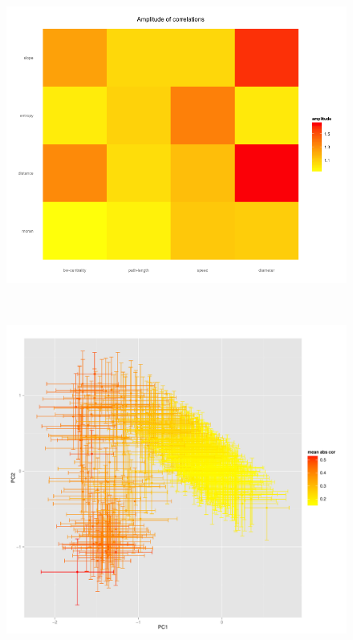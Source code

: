 \documentclass{article}
\begin{document}
\begin{figure}[h!]
\begin{minipage}{0.34\linewidth}
\includegraphics[width=\textwidth]{heatmap_amplCor}
\end{minipage}\\
\begin{minipage}{0.45\linewidth}
\includegraphics[width=\textwidth]{pca_meanAbsCor_errorBars}
\end{minipage}
\begin{minipage}{0.45\linewidth}

\end{minipage}
\end{figure}
\end{document}
